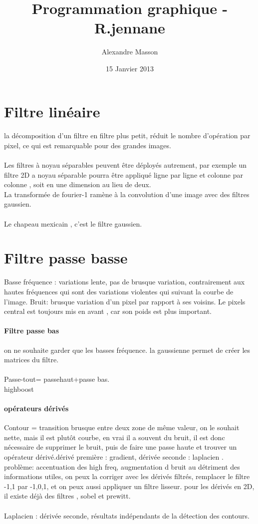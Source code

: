 \documentclass{article}
\title{Programmation graphique - R.jennane}
\author{Alexandre Masson}
\date{15 Janvier 2013}
\begin{document}
\maketitle
\newpage
\tableofcontents
\newpage
\section{Filtre linéaire}
\paragraph{}la décomposition d'un filtre en filtre plus petit, réduit le nombre d'opération par pixel, ce qui est remarquable pour des grandes images.\\\\Les filtres à noyau séparables peuvent être déployés autrement, par exemple un filtre 2D a noyau séparable pourra être appliqué ligne par ligne et colonne par colonne , soit en une dimension au lieu de deux.\\La transformée de fourier-1 ramène à la convolution d'une image avec des filtres gaussien.\\\\
Le chapeau mexicain , c'est le filtre gaussien.
\section{Filtre passe basse}
Basse fréquence : variations lente, pas de brusque variation, contrairement aux hautes fréquences qui sont des variations violentes qui suivant la courbe de l'image. Bruit:  brusque variation d'un pixel par rapport à ses voisins. Le pixels central est toujours mis en avant , car son poids est plus important.
\paragraph{Filtre passe bas} on ne souhaite garder que les basses fréquence. la gaussienne permet de créer les matrices du filtre.\\\\Passe-tout= passehaut+passe bas.\\highboost
\paragraph{opérateurs dérivés} Contour  = transition brusque entre deux zone de même valeur, on le souhait nette, mais il est plutôt courbe, en vrai il a souvent du bruit, il est donc nécessaire de supprimer le bruit, puis de faire une passe haute et trouver un opérateur dérivé.dérivé première : gradient, dérivée seconde : laplacien . problème:  accentuation des high freq, augmentation d bruit au détriment des informations utiles, on peux la corriger avec les dérivés filtrés, remplacer le filtre -1,1 par -1,0,1, et on peux aussi appliquer un filtre lisseur. pour les dérivés en 2D, il existe déjà des filtres , sobel et prewitt.\\\\Laplacien : dérivée seconde, résultats indépendants de la détection des contours.
\end{document}
